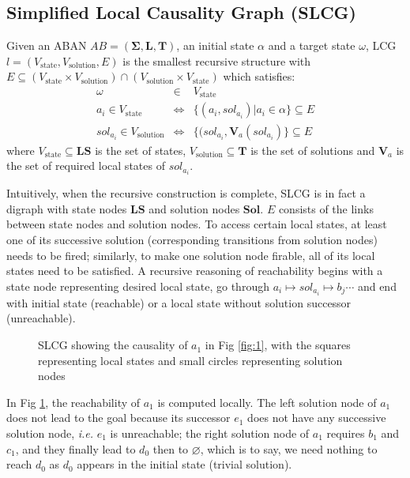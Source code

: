 \documentclass[runningheads]{llncs}
\begin{document}
\subsection{Simplified Local Causality Graph (SLCG)}

\begin{definition}[LCG]\label{defLCG}
Given an ABAN $AB = (\mathbf{\Sigma},\mathbf{L},\mathbf{T})$, an initial state $\alpha$ and a target state $\omega$, LCG $l= (V_{\mathrm{state}},V_{\mathrm{solution}},E)$ is the smallest recursive structure with $E \subseteq (V_{\mathrm{state}}\times V_{\mathrm{solution}})\cap (V_{\mathrm{solution}}\times V_{\mathrm{state}})$ which satisfies:
\begin{eqnarray*}
    \omega&\in& V_{\mathrm{state}} \\
    a_i\in V_{\mathrm{state}} &\Leftrightarrow& \{ (a_i, sol_{a_i})| a_i\in \alpha\}\subseteq E \\
    sol_{a_i}\in V_{\mathrm{solution}}&\Leftrightarrow& \{ (sol_{a_i},\mathbf{V}_a (sol_{a_i})\}\subseteq E
\end{eqnarray*}
where $V_{\mathrm{state}}\subseteq\mathbf{LS}$ is the set of states, $V_{\mathrm{solution}}\subseteq \mathbf{T}$ is the set of solutions and $\mathbf{V}_a$ is the set of required local states of $sol_{a_i}$.
\end{definition}
Intuitively, when the recursive construction is complete, SLCG is in fact a digraph with state nodes $\mathbf{LS}$ and solution nodes $\mathbf{Sol}$. 
$E$ consists of the links between state nodes and solution nodes. 
To access certain local states, at least one of its successive solution (corresponding transitions from solution nodes) needs to be fired; similarly, to make one solution node firable, all of its local states need to be satisfied. 
A recursive reasoning of reachability begins with a state node representing desired local state, go through $a_i\mapsto sol_{a_i}\mapsto b_j \cdots$ and end with initial state (reachable) or a local state without solution successor (unreachable).

\begin{figure}[!ht]
\centering

\caption{SLCG showing the causality of $a_1$ in Fig \ref{fig:1}, with the squares representing local states and small circles representing solution nodes}
\label{fig:2}
\end{figure}
In Fig \ref{fig:2}, the reachability of $a_1$ is computed locally. 
The left solution node of $a_1$ does not lead to the goal because its successor $e_1$ does not have any successive solution node, \textit{i.e.} $e_1$ is unreachable;
the right solution node of $a_1$ requires $b_1$ and $c_1$, and they finally lead to $d_0$ then to $\varnothing$, which is to say, we need nothing to reach $d_0$ as $d_0$ appears in the initial state (trivial solution).
\end{document}
